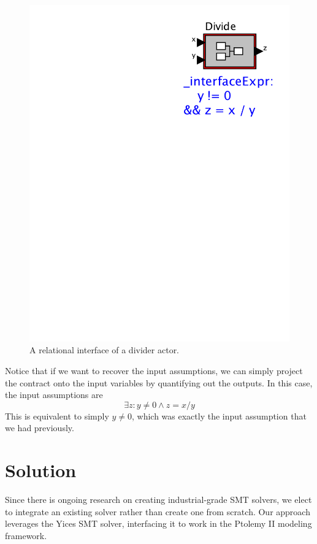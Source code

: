 \documentclass[preprint,11pt]{sigplanconf}
\begin{document}
\begin{figure}[htbp]
\centering
\includegraphics[scale=0.6]{figs/Divide2} 
\caption{A relational interface of a divider actor.}
\label{fig:dividerNew}
\end{figure}

Notice that if we want to recover the input assumptions, we can simply project
the contract onto the input variables by quantifying out the outputs.
In this case, the input assumptions are 
\[
\exists z : y \ne 0 \wedge z = x / y 
\]
This is equivalent to simply $y \ne 0$, which was exactly the input assumption
that we had previously.

\section{Solution}
Since there is ongoing research on creating industrial-grade SMT solvers,
we elect to integrate an existing solver rather than create one from scratch.
Our approach leverages the Yices\cite{yices} SMT solver, interfacing it to
work in the Ptolemy II modeling framework.
\end{document}
